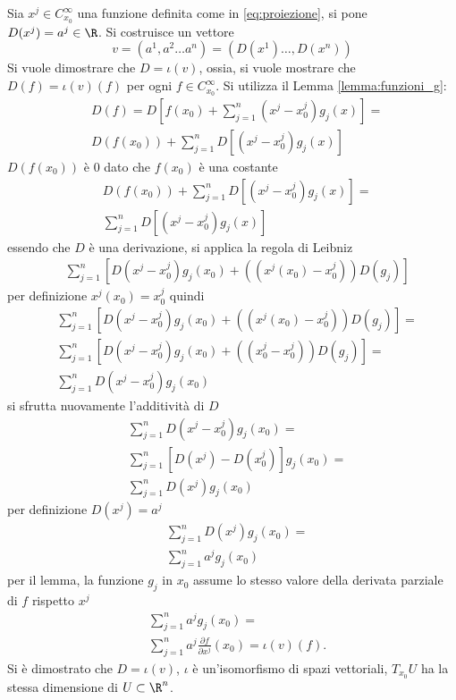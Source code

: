 \documentclass[10pt, letterpaper]{report}
\begin{document}
Sia $ x^j\in C_{x_0}^\infty$ una funzione definita come in \eqref{eq:proiezione}, si pone $D( x^j)=a^j \in\R$. Si costruisce un vettore\begin{equation}
    v=(a^1,a^2\dots a^n)=(D( x^1)\dots,D( x^n))
\end{equation}
Si vuole dimostrare che $D=\iota(v)$, ossia, si vuole mostrare che $D(f)=\iota(v)(f)$ per ogni $f\in C_{x_0}^\infty$. Si utilizza il Lemma \ref{lemma:funzioni_g}:\begin{align}
    &D(f)=D[f(x_0)+\sum_{j=1}^n(x^j-x_0^j)g_j(x)]=\\
    &D(f(x_0))+\sum_{j=1}^nD[(x^j-x_0^j)g_j(x)]
\end{align}
$D(f(x_0))$ è 0 dato che $f(x_0)$ è una costante
\begin{align}
    &D(f(x_0))+\sum_{j=1}^nD[(x^j-x_0^j)g_j(x)]=\\
    &\sum_{j=1}^nD[(x^j-x_0^j)g_j(x)]
\end{align}
essendo che $D$ è una derivazione, si applica la regola di Leibniz
\begin{align}
    &\sum_{j=1}^n[D(x^j-x_0^j)g_j(x_0)+((x^j(x_0)-x_0^j))D(g_j)]
\end{align}
per definizione $x^j(x_0)=x_0^j$ quindi 
\begin{align}
    &\sum_{j=1}^n[D(x^j-x_0^j)g_j(x_0)+((x^j(x_0)-x_0^j))D(g_j)]=\\
    &\sum_{j=1}^n[D(x^j-x_0^j)g_j(x_0)+((x^j_0-x_0^j))D(g_j)]=\\
     &\sum_{j=1}^n D(x^j-x_0^j)g_j(x_0)
\end{align}
si sfrutta nuovamente l'additività di $D$
\begin{align}
     &\sum_{j=1}^n D(x^j-x_0^j)g_j(x_0)=\\
     &\sum_{j=1}^n [D(x^j)-D(x_0^j)]g_j(x_0)=\\
      &\sum_{j=1}^n D(x^j)g_j(x_0)
\end{align}
per definizione $D(x^j)=a^j$
\begin{align}
      &\sum_{j=1}^n D(x^j)g_j(x_0)=\\
      &\sum_{j=1}^n a^jg_j(x_0)
\end{align}
per il lemma, la funzione $g_j$ in $x_0$ assume lo stesso valore della derivata parziale di $f$ rispetto $x^j$\begin{align}
     &\sum_{j=1}^n a^jg_j(x_0)=\\
      &\sum_{j=1}^n a^j\frac{\partial f}{\partial x^j}(x_0)=\iota(v)(f).
\end{align}
Si è dimostrato che $D=\iota(v)$, $\iota$ è un'isomorfismo di spazi vettoriali, $T_{x_0}U$ ha la stessa dimensione di $U\subset\R^n$.\bigskip
\end{document}

